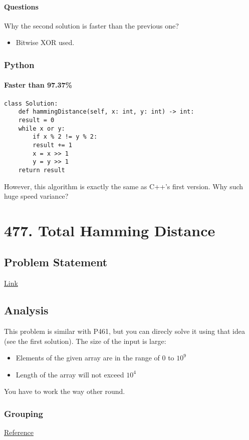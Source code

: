 \documentclass[12pt]{book}
\begin{document}
\subsubsection{Questions}
\label{sec:org0de3b39}
Why the second solution is faster than the previous one?
\begin{itemize}
\item Bitwise XOR used.
\end{itemize}
\subsection{Python}
\label{sec:orga47f210}
\subsubsection{Faster than 97.37\%}
\label{sec:orgad0c186}
\begin{verbatim}
class Solution:
    def hammingDistance(self, x: int, y: int) -> int:
	result = 0
	while x or y:
	    if x % 2 != y % 2:
		result += 1
	    x = x >> 1
	    y = y >> 1
	return result
\end{verbatim}
However, this algorithm is exactly the same as C++'s first version. Why such huge speed variance?
\chapter{477. Total Hamming Distance}
\label{sec:org1414837}
\section{Problem Statement}
\label{sec:orgf3982e5}
\href{https://leetcode.com/problems/total-hamming-distance/}{Link}
\section{Analysis}
\label{sec:org45c6a09}
This problem is similar with P461, but you can direcly solve it using that idea (see the first solution). The size of the input is large:
\begin{itemize}
\item Elements of the given array are in the range of \(0\) to \(10^9\)
\item Length of the array will not exceed \(10^4\)
\end{itemize}

You have to work the way other round.
\subsection{Grouping}
\label{sec:orgbfe08a8}
\href{https://leetcode.com/problems/total-hamming-distance/discuss/96250/C++-O(n)-runtime-O(1)-space}{Reference}
\end{document}
